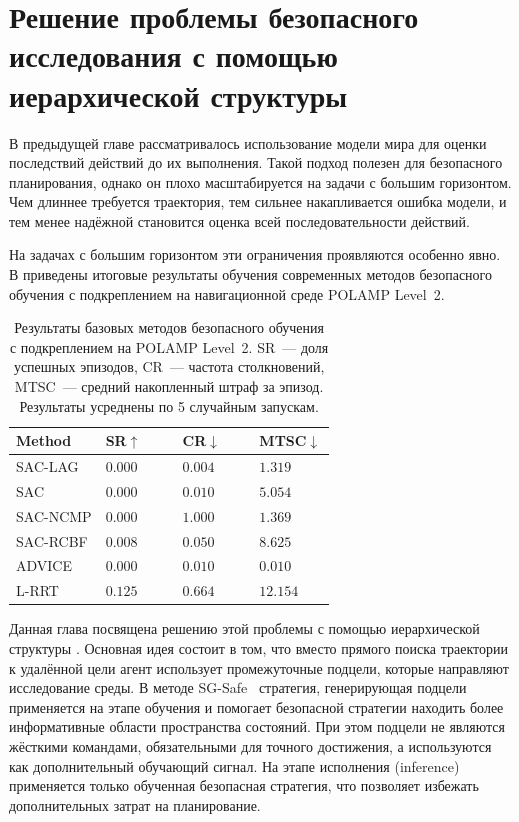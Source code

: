 ﻿%
\chapter{Решение проблемы безопасного исследования с помощью иерархической структуры}
\label{ch:hierarchical_safe_exploration}

В предыдущей главе рассматривалось использование модели мира для оценки последствий действий до их выполнения. Такой подход полезен для безопасного планирования, однако он плохо масштабируется на задачи с большим горизонтом. Чем длиннее требуется траектория, тем сильнее накапливается ошибка модели, и тем менее надёжной становится оценка всей последовательности действий.

На задачах с большим горизонтом эти ограничения проявляются особенно явно. В  приведены итоговые результаты обучения современных методов безопасного обучения с подкреплением на навигационной среде POLAMP Level~2.

\begin{table}[htbp]
\centering
\caption{Результаты базовых методов безопасного обучения с подкреплением на POLAMP Level~2. SR~--- доля успешных эпизодов, CR~--- частота столкновений, MTSC~--- средний накопленный штраф за эпизод. Результаты усреднены по 5 случайным запускам.}
\label{tab:polamp_l2_baselines}
\small
\setlength{\tabcolsep}{6pt}
\renewcommand{\arraystretch}{1.15}
\begin{tabularx}{\linewidth}{@{}>{\raggedright\arraybackslash}X>{\centering\arraybackslash}p{0.24\linewidth}>{\centering\arraybackslash}p{0.24\linewidth}>{\centering\arraybackslash}p{0.24\linewidth}@{}}
\toprule
Method & SR$\uparrow$ & CR$\downarrow$ & MTSC$\downarrow$ \\
\midrule
SAC-LAG & $0.000$ & $0.004$ & $1.319$ \\
SAC & $0.000$ & $0.010$ & $5.054$ \\
SAC-NCMP & $0.000$ & $1.000$ & $1.369$ \\
SAC-RCBF & $0.008$ & $0.050$ & $8.625$ \\
ADVICE & $0.000$ & $0.010$ & $0.010$ \\
L-RRT & $0.125$ & $0.664$ & $12.154$ \\
\bottomrule
\end{tabularx}
\end{table}

Данная глава посвящена решению этой проблемы с помощью иерархической структуры . Основная идея состоит в том, что вместо прямого поиска траектории к удалённой цели агент использует промежуточные подцели, которые направляют исследование среды. В методе SG-Safe~\cite{gorbov2026sgsafe} стратегия, генерирующая подцели применяется на этапе обучения и помогает безопасной стратегии находить более информативные области пространства состояний. При этом подцели не являются жёсткими командами, обязательными для точного достижения, а используются как дополнительный обучающий сигнал. На этапе исполнения (inference) применяется только обученная безопасная стратегия, что позволяет избежать дополнительных затрат на планирование.

